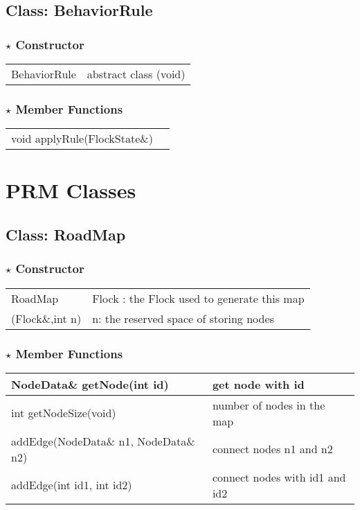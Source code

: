 \documentclass[onecolumn,10pt]{article}
\begin{document}
\subsection{Class: BehaviorRule}

\subsubsection*{$\star$ Constructor}
\begin{tabular}{l|l}
BehaviorRule & abstract class
(void)
\end{tabular}

\subsubsection*{$\star$ Member Functions}

\begin{tabular}{l|l}
void applyRule(FlockState\&) & 
\end{tabular}

\section{PRM Classes}
\subsection{Class: RoadMap}

\subsubsection*{$\star$ Constructor}
\begin{tabular}{l|l}
RoadMap             & Flock : the Flock used to generate this map \\
(Flock\&,int n)    & n: the reserved space of storing nodes 
\end{tabular}

\subsubsection*{$\star$ Member Functions}

\begin{tabular}{l|l}
NodeData\& getNode(int id)           & get node with id \\\hline
int getNodeSize(void)                    & number of nodes in the map \\\hline
addEdge(NodeData\& n1, NodeData\& n2) & connect nodes n1 and n2 \\\hline
addEdge(int id1, int id2)            & connect nodes with id1 and id2
\end{tabular}
	
\end{document}
